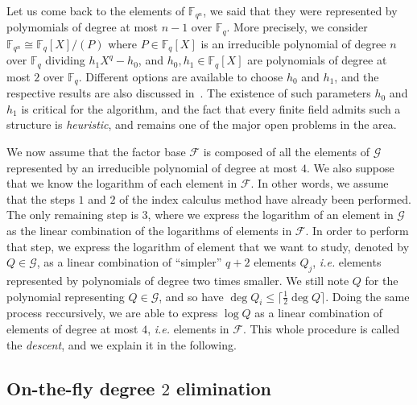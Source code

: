 \documentclass[a4paper,11pt]{article}
\theoremstyle{break}
\theoremstyle{sc}
\theoremstyle{definition}
\theoremstyle{remark}
\newcommand{\ie}{\emph{i.e. }}
\begin{document}
Let us come back to the elements of $\mathbb{F}_{q^n}$, we said that they were
represented by polymomials of degree at most $n-1$ over $\mathbb{F}_q$. More
precisely, we consider $\mathbb{F}_{q^n}\cong \mathbb{F}_{q}[X]/(P)$ where $P\in
\mathbb{F}_{q}[X]$ is an irreducible polynomial of degree $n$ over
$\mathbb{F}_{q}$ dividing $h_1X^q-h_0$, and $h_0, h_1\in \mathbb{F}_q[X]$ are
polynomials of degree at most $2$ over $\mathbb{F}_q$. Different options are
available to choose $h_0$ and $h_1$, and the respective results are also
discussed in~\cite{JP14}. The existence of such parameters $h_0$ and $h_1$ is
critical for the algorithm, and the fact that every finite field admits such a
structure is \emph{heuristic}, and remains one of the major open problems in the
area.

We now assume that the factor base $\mathcal F$ is composed of all the
elements of $\mathcal G$ represented by an irreducible polynomial of degree at
most $4$. We also suppose that we know the logarithm of each element in
$\mathcal F$. In other words, we assume that the steps $1$ and $2$ of the index
calculus method have already been performed. The only remaining step is $3$,
where we express the logarithm of an element in $\mathcal G$ as the linear
combination of the logarithms of elements in $\mathcal F$. In order to perform
that step, we express the logarithm of element that we want to study, denoted by
$Q\in\mathcal G$, as a linear combination of ``simpler'' $q+2$ elements $Q_j$,
\ie elements represented by polynomials of degree two times smaller. We
still note $Q$ for the polynomial representing $Q\in
\mathcal G$, and so have $\deg Q_i\leq \lceil \frac{1}{2}\deg Q\rceil$. Doing
the same process reccursively, we are able to express $\log Q$ as a linear
combination of elements of degree at most $4$, \ie elements in $\mathcal F$.
This whole procedure is called the \emph{descent}, and we explain it in the
following. 

\subsection{On-the-fly degree $2$ elimination}
\end{document}

